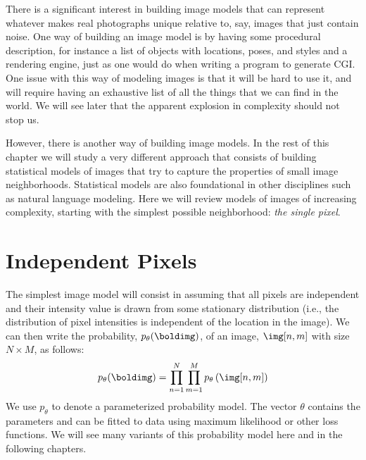 There is a significant interest in building image models that can represent whatever makes real photographs unique relative to, say, images that just contain noise. One way of building an image model is by having some procedural description, for instance a list of objects with locations, poses, and styles and a rendering engine, just as one would do when writing a program to generate CGI. One issue with this way of modeling images is that it will be hard to use it, and will require having an exhaustive list of all the things that we can find in the world. We will see later that the apparent explosion in complexity should not stop us. 

However, there is another way of building image models. In the rest of this chapter we will study a very different approach that consists of building statistical models of images that try to capture the properties of small image neighborhoods. Statistical models are also foundational in other disciplines such as natural language modeling. 
Here we will review models of images of increasing complexity, starting with the simplest possible neighborhood: {\em the single pixel}.


\section{Independent Pixels}
\label{sec:independent_pixels}



The simplest image model will consist in assuming that all pixels are independent and their intensity value is drawn from some stationary distribution (i.e., the distribution of pixel intensities is independent of the location in the image). We can then write the probability, $p_{\theta}(\boldimg)$, of an image, $\img [n,m]$ with size $N \times M$, as follows:
\begin{equation}
p_{\theta}(\boldimg) = \prod_{n=1}^{N} \prod_{m=1}^{M} p_{\theta}\left(\img [n,m] \right)
\label{eq:histmodel}
\end{equation}
We use $p_{\theta}$ to denote a parameterized probability model. The vector $\theta$ contains the parameters and can be fitted to data using maximum likelihood or other loss functions. We will see many variants of this probability model here and in the following chapters. 

